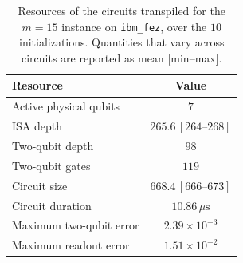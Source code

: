 \begin{table}[H]
\centering
\caption{Resources of the circuits transpiled for the $m=15$ instance on \texttt{ibm\_fez}, over the $10$ initializations. Quantities that vary across circuits are reported as mean [min--max].}
\label{tab:hardware_resources}
\begin{tabular}{lc}
\toprule
Resource & Value \\
\midrule
Active physical qubits & $7$ \\
ISA depth & $265.6\,[264\text{--}268]$ \\
Two-qubit depth & $98$ \\
Two-qubit gates & $119$ \\
Circuit size & $668.4\,[666\text{--}673]$ \\
Circuit duration & $10.86\,\mu\mathrm{s}$ \\
Maximum two-qubit error & $2.39\times10^{-3}$ \\
Maximum readout error & $1.51\times10^{-2}$ \\
\bottomrule
\end{tabular}
\end{table}
